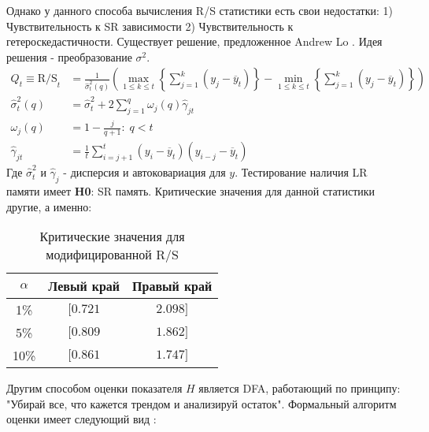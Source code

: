 Однако у данного способа вычисления R/S статистики есть свои недостатки: 1) Чувствительность к SR зависимости 2) Чувствительность к гетероскедастичности. Существует решение, предложенное Andrew Lo \cite{andrew1991longterm}. Идея решения - преобразование $\sigma^2$.
\begin{equation}
	\begin{split}
		Q_t \equiv \text{R/S}_t & = \frac{1}{\hat{\sigma}^2_t(q)} \left(\max_{1 \le k \le t} \left\{\sum_{j = 1}^k (y_j - \overline{y}_t)\right\} - \min_{1 \le k \le t} \left\{\sum_{j = 1}^k (y_j - \overline{y}_t)\right\}\right)\\
		\hat{\sigma}^2_t(q) & = \hat{\sigma}^2_t + 2 \sum_{j = 1}^q \omega_j(q) \hat{\gamma}_{jt}\\
		\omega_j(q) & = 1 - \frac{j}{q + 1}: \; q < t\\
		\hat{\gamma}_{jt} & = \frac{1}{t} \sum_{i = j + 1}^t (y_i - \overline{y}_t)(y_{i - j} - \overline{y}_t)
	\end{split}
\end{equation}
Где $\hat{\sigma}^2_t$ и $\hat{\gamma}_j$ - дисперсия и автоковариация для $y$. Тестирование наличия LR памяти имеет \textbf{H0}: SR память. Критические значения для данной статистики другие, а именно:
\begin{table}[H]
	\centering
	\begin{tabular}{c|cc}
		\toprule
		$\alpha$ & Левый край & Правый край\\
		\midrule[0.02cm]
		1\% & $[0.721$ & $2.098]$\\
		5\% & $[0.809$ & $1.862]$\\
		10\% & $[0.861$ & $1.747]$\\
		\midrule[0.02cm]
	\end{tabular}
	\caption{Критические значения для модифицированной R/S}
\end{table}
\noindent Другим способом оценки показателя $H$ является DFA, работающий по принципу: "Убирай все, что кажется трендом и анализируй остаток". Формальный алгоритм оценки имеет следующий вид \cite{garafutdinov2021research}:
